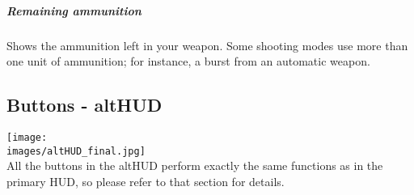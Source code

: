 \subparagraph{Remaining ammunition}
Shows the ammunition left in your weapon. Some shooting modes use more than one unit of ammunition; for instance, a burst from an automatic weapon.

\subsection{Buttons - altHUD}

\texttt{[image: \\images/altHUD\_final.jpg]}\\

All the buttons in the altHUD perform exactly the same functions as in the primary HUD, so please refer to that section for details.
